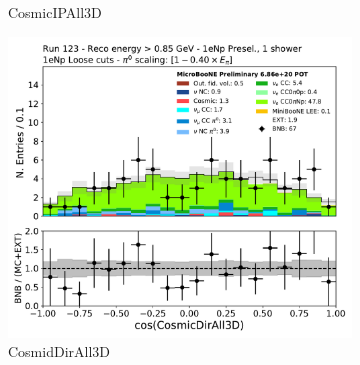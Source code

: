 \begin{figure}[H]
\begin{subfigure}{0.3\textwidth}
    \caption{CosmicIPAll3D}
    \end{subfigure}
    \begin{subfigure}{0.3\textwidth}
    \includegraphics[width=1.0\textwidth]{Sidebands/Figures/1eNp/HighEnergy/HiEext_NPOneShr_NPL_pi0e040/CosmicDirAll3D.pdf}
    \caption{CosmidDirAll3D}
    \end{subfigure}
    \caption{} 
    \label{fig:HE_1eNp_L_5}
\end{figure}


